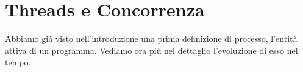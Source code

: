 \chapter{Threads e Concorrenza}
Abbiamo già visto nell'introduzione una prima definizione di processo, l'entità attiva di un programma. Vediamo ora più nel dettaglio l'evoluzione di esso nel tempo.





